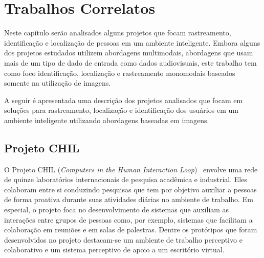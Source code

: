 \chapter{Trabalhos Correlatos}
\label{cap:trabalhos_correlatos}

Neste capítulo serão analisados alguns projetos que focam rastreamento, identificação e localização de pessoas em um ambiente inteligente. Embora alguns dos projetos estudados utilizem abordagens multimodais, abordagens que usam mais de um tipo de dado de entrada como dados audiovisuais, este trabalho tem como foco identificação, localização e rastreamento monomodais baseados somente na utilização de imagens.




A seguir é apresentada uma descrição dos projetos analisados que focam em soluções para rastreamento, localização e identificação dos usuários em um ambiente inteligente utilizando abordagens baseadas em imagens.




\section{Projeto CHIL}

O Projeto CHIL (\textit{Computers in the Human Interaction Loop})~\cite{chil, computerschil} envolve uma rede de quinze laboratórios internacionais de pesquisa acadêmica e industrial. Eles colaboram entre si conduzindo pesquisas que tem por objetivo auxiliar a pessoas de forma proativa durante suas atividades diárias no ambiente de trabalho. Em especial, o projeto foca no desenvolvimento de sistemas que auxiliam as interações entre grupos de pessoas como, por exemplo, sistemas que facilitam a colaboração em reuniões e em salas de palestras. Dentre os protótipos que foram desenvolvidos no projeto destacam-se um ambiente de trabalho perceptivo e colaborativo e um sistema perceptivo de apoio a um escritório virtual.

